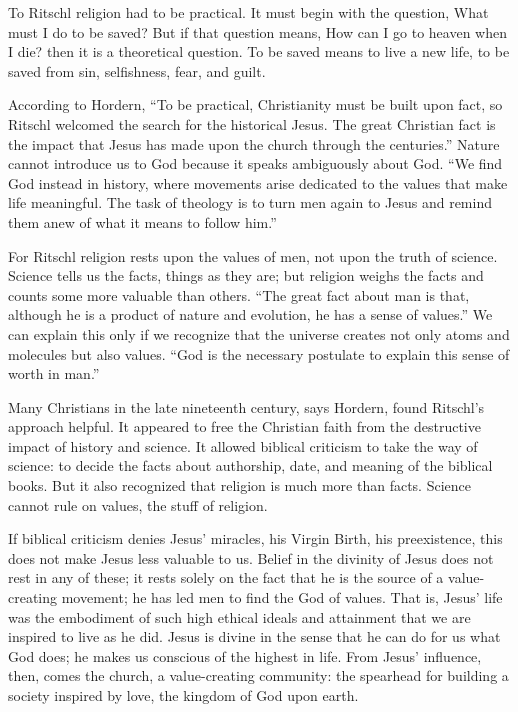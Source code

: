 To Ritschl religion had to be practical. It must begin with the question, What must I do to be
saved? But if that question means, How can I go to heaven when I die? then it is a theoretical
question. To be saved means to live a new life, to be saved from sin, selfishness, fear, and guilt.

According to Hordern, “To be practical, Christianity must be built upon fact, so Ritschl welcomed
the search for the historical Jesus. The great Christian fact is the impact that Jesus has made upon
the church through the centuries.” Nature cannot introduce us to God because it speaks ambiguously
about God. “We find God instead in history, where movements arise dedicated to the values that make
life meaningful. The task of theology is to turn men again to Jesus and remind them anew of what it
means to follow him.”

For Ritschl religion rests upon the values of men, not upon the truth of science. Science tells us
the facts, things as they are; but religion weighs the facts and counts some more valuable than
others. “The great fact about man is that, although he is a product of nature and evolution, he has
a sense of values.” We can explain this only if we recognize that the universe creates not only
atoms and molecules but also values. “God is the necessary postulate to explain this sense of worth
in man.”

Many Christians in the late nineteenth century, says Hordern, found Ritschl’s approach helpful. It
appeared to free the Christian faith from the destructive impact of history and science. It allowed
biblical criticism to take the way of science: to decide the facts about authorship, date, and
meaning of the biblical books. But it also recognized that religion is much more than facts. Science
cannot rule on values, the stuff of religion.

If biblical criticism denies Jesus’ miracles, his Virgin Birth, his preexistence, this does not make
Jesus less valuable to us. Belief in the divinity of Jesus does not rest in any of these; it rests
solely on the fact that he is the source of a value-creating movement; he has led men to find the
God of values. That is, Jesus’ life was the embodiment of such high ethical ideals and attainment
that we are inspired to live as he did. Jesus is divine in the sense that he can do for us what God
does; he makes us conscious of the highest in life. From Jesus’ influence, then, comes the church, a
value-creating community: the spearhead for building a society inspired by love, the kingdom of God
upon earth.

